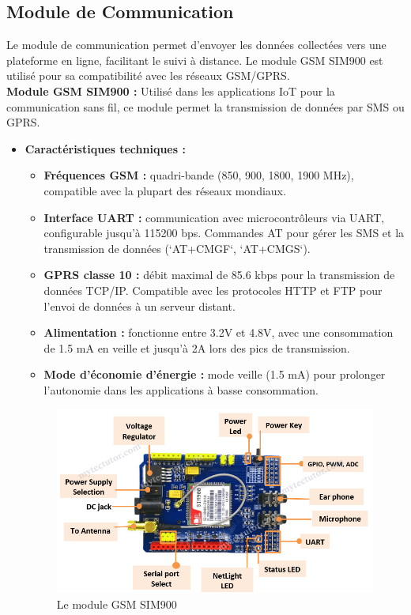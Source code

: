 \subsection{Module de Communication}

Le module de communication permet d’envoyer les données collectées vers une plateforme en ligne, facilitant le suivi à distance. Le module GSM SIM900 est utilisé pour sa compatibilité avec les réseaux GSM/GPRS.\\

\textbf{Module GSM SIM900 :} Utilisé dans les applications IoT pour la communication sans fil, ce module permet la transmission de données par SMS ou GPRS.

\begin{itemize} \item \textbf{Caractéristiques techniques :}
	
	\begin{itemize}
		\item \textbf{Fréquences GSM :} quadri-bande (850, 900, 1800, 1900 MHz), compatible avec la plupart des réseaux mondiaux.
		
		\item \textbf{Interface UART :} communication avec microcontrôleurs via UART, configurable jusqu'à 115200 bps. Commandes AT pour gérer les SMS et la transmission de données (`AT+CMGF`, `AT+CMGS`).
		
		\item \textbf{GPRS classe 10 :} débit maximal de 85.6 kbps pour la transmission de données TCP/IP. Compatible avec les protocoles HTTP et FTP pour l'envoi de données à un serveur distant.
		
		\item \textbf{Alimentation :} fonctionne entre 3.2V et 4.8V, avec une consommation de 1.5 mA en veille et jusqu’à 2A lors des pics de transmission.
		
		\item \textbf{Mode d’économie d’énergie :} mode veille (1.5 mA) pour prolonger l’autonomie dans les applications à basse consommation.
	\end{itemize}
	
	\begin{figure}[H]
		\centering
		\includegraphics[width=12cm]{./img/composants/SIM900.png}
		\caption{Le module GSM SIM900 \cite{7}}
		\label{i1}
	\end{figure}
	

\end{itemize}
